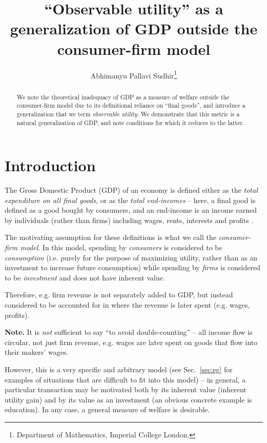 \documentclass{journal}
\title{``Observable utility'' as a generalization of GDP outside the consumer-firm model}
\author{Abhimanyu Pallavi Sudhir\thanks{Department of Mathematics, Imperial College London.}}
\theoremstyle{plain}
\theoremstyle{definition}
\begin{document}
\maketitle

\begin{abstract}
    We note the theoretical inadequacy of GDP as a measure of welfare outside the consumer-firm model due to its definitional reliance on ``final goods'', and introduce a generalization that we term \emph{observable utility}. We demonstrate that this metric is a natural generalization of GDP, and note conditions for which it reduces to the latter.
\end{abstract}

\section{Introduction}
\label{sec:intro}

The Gross Domestic Product (GDP) of an economy is defined either as the \emph{total expenditure on all final goods}, or as the \emph{total end-incomes} -- here, a final good is defined as a good bought by consumers, and an end-income is an income earned by individuals (rather than firms) including wages, rents, interests and profits \cite{bea}. 

The motivating assumption for these definitions is what we call the \emph{consumer-firm model}. In this model, spending by \emph{consumers} is considered to be \emph{consumption} (i.e. purely for the purpose of maximizing utility, rather than as an investment to increase future consumption) while spending by \emph{firms} is considered to be \emph{investment} and does not have inherent value.

Therefore, e.g. firm revenue is not separately added to GDP, but instead considered to be accounted for in where the revenue is later spent (e.g. wages, profits).

\textbf{Note.} It is \emph{not} sufficient to say ``to avoid double-counting'' -- all income flow is circular, not just firm revenue, e.g. wages are later spent on goods that flow into their makers' wages.

However, this is a very specific and arbitrary model (see Sec.~\ref{sec:eg} for examples of situations that are difficult to fit into this model) -- in general, a particular transaction may be motivated both by its inherent value (inherent utility gain) and by its value as an investment (an obvious concrete example is education). In any case, a general measure of welfare is desirable.
\end{document}
